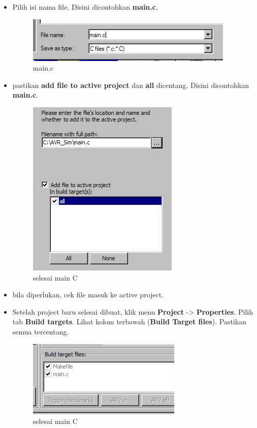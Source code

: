 \documentclass[12pt,]{article}
\begin{document}
\begin{itemize}
		\item Pilih isi nama file.
		Disini dicontohkan \textbf{main.c}.
		\begin{figure}[H]
			\centering
			\includegraphics[width=0.5\linewidth]{images/hello_a12}
			\caption{main.c}
		\end{figure}
	
		\newpage
		\item pastikan \textbf{add file to active project} dan \textbf{all} dicentang.
		Disini dicontohkan \textbf{main.c}.
		\begin{figure}[H]
			\centering
			\includegraphics[width=0.5\linewidth]{images/hello_a13}
			\caption{selesai main C}
		\end{figure}
		
		\item bila diperlukan, cek file masuk ke active project.
		\item Setelah project baru selesai dibuat, klik menu \textbf{Project} -> \textbf{Properties}.
		Pilih tab \textbf{Build targets}.
		Lihat kolom terbawah (\textbf{Build Target files}).
		Pastikan semua tercentang.
		\begin{figure}[H]
			\centering
			\includegraphics[width=0.5\linewidth]{images/hello_a14}
			\caption{selesai main C}
		\end{figure}
		
	\end{itemize}
\end{document}
